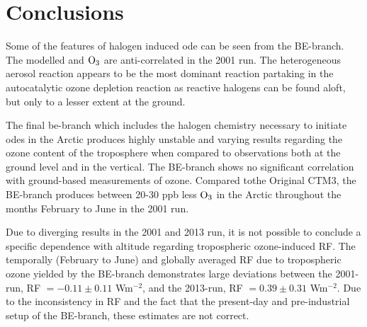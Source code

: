 \setcounter{chapter}{7}
\chapter{Conclusions}\label{Chap:conclusion}


Some of the features of halogen induced \acrshort{ode} can be seen from the BE-branch. The modelled  and $\mathrm{O_3}$ are anti-correlated in the 2001 run. The heterogeneous aerosol reaction appears to be the most dominant reaction partaking in the autocatalytic ozone depletion reaction as reactive halogens can be found aloft, but only to a lesser extent at the ground. 

\medskip

The final \acrlong{be}-branch which includes the halogen chemistry necessary to initiate \acrlong{ode}s in the Arctic produces highly unstable and varying results regarding the ozone content of the troposphere when compared to observations both at the ground level and in the vertical. The BE-branch shows no significant correlation with ground-based measurements of ozone. Compared tothe Original CTM3, the BE-branch produces between 20-30 ppb less $\mathrm{O_3}$ in the Arctic throughout the months February to June in the 2001 run. 


\medskip

Due to diverging results in the 2001 and 2013 run, it is not possible to conclude a specific dependence with altitude regarding tropospheric ozone-induced RF. The temporally (February to June) and globally averaged RF due to tropospheric ozone yielded by the BE-branch demonstrates large deviations between the 2001-run, RF $=-0.11\pm0.11$ Wm$^{-2}$, and the 2013-run, RF $= 0.39\pm0.31$ Wm$^{-2}$. Due to the inconsistency in RF and the fact that the present-day and pre-industrial setup of the BE-branch, these estimates are not correct. 